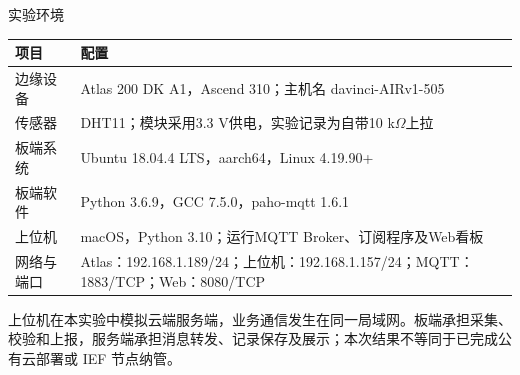 \documentclass[UTF8,zihao=-4,a4paper]{ctexart}
\newcommand{\rowgap}{\vspace*{0pt}}
\begin{document}
\begin{reprow}{实验环境}
\par\begingroup\small
\renewcommand{\arraystretch}{1.18}
\noindent\begin{tabularx}{\linewidth}{|Y{0.3305785}|Y{1.6694215}|}
\hline
\textbf{项目} & \textbf{配置} \\ \hline
边缘设备 & Atlas 200 DK A1，Ascend 310；主机名 davinci-AIRv1-505 \\ \hline
传感器 & DHT11；模块采用3.3 V供电，实验记录为自带10 k\ensuremath{\Omega}上拉 \\ \hline
板端系统 & Ubuntu 18.04.4 LTS，aarch64，Linux 4.19.90+ \\ \hline
板端软件 & Python 3.6.9，GCC 7.5.0，paho-mqtt 1.6.1 \\ \hline
上位机 & macOS，Python 3.10；运行MQTT Broker、订阅程序及Web看板 \\ \hline
网络与端口 & Atlas：192.168.1.189/24；上位机：192.168.1.157/24；MQTT：1883/TCP；Web：8080/TCP \\ \hline
\end{tabularx}\par\endgroup
\smallskip
上位机在本实验中模拟云端服务端，业务通信发生在同一局域网。板端承担采集、校验和上报，服务端承担消息转发、记录保存及展示；本次结果不等同于已完成公有云部署或 IEF 节点纳管。\par

\end{reprow}\rowgap
\end{document}
